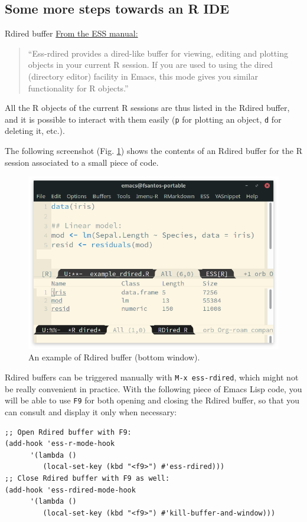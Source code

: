 \documentclass[presentation]{beamer}
\begin{document}
\subsection{Some more steps towards an R IDE}
\label{sec:orgc82ee3a}
\begin{frame}[fragile,allowframebreaks,label=]{Rdired buffer}
 \href{http://ess.r-project.org/Manual/ess.html\#Rdired}{From the ESS manual:}

\begin{quote}
``Ess-rdired provides a dired-like buffer for viewing, editing and plotting objects in your current R session. If you are used to using the dired (directory editor) facility in Emacs, this mode gives you similar functionality for R objects.''
\end{quote}

All the R objects of the current R sessions are thus listed in the Rdired buffer, and it is possible to interact with them easily (\texttt{p} for plotting an object, \texttt{d} for deleting it, etc.).

The following screenshot (Fig. \ref{fig:org39e3048}) shows the contents of an Rdired buffer for the R session associated to a small piece of code.

\begin{figure}[htbp]
\centering
\includegraphics[width=0.65 \textwidth]{./images/rdired.png}
\caption{\label{fig:org39e3048}An example of Rdired buffer (bottom window).}
\end{figure}

\pagebreak

Rdired buffers can be triggered manually with \texttt{M-x ess-rdired}, which might not be really convenient in practice. With the following piece of Emacs Lisp code, you will be able to use \texttt{F9} for both opening and closing the Rdired buffer, so that you can consult and display it only when necessary:

\begin{verbatim}
;; Open Rdired buffer with F9:
(add-hook 'ess-r-mode-hook
	  '(lambda ()
	     (local-set-key (kbd "<f9>") #'ess-rdired)))
;; Close Rdired buffer with F9 as well:
(add-hook 'ess-rdired-mode-hook
	  '(lambda ()
	     (local-set-key (kbd "<f9>") #'kill-buffer-and-window)))
\end{verbatim}
\end{frame}
\end{document}
